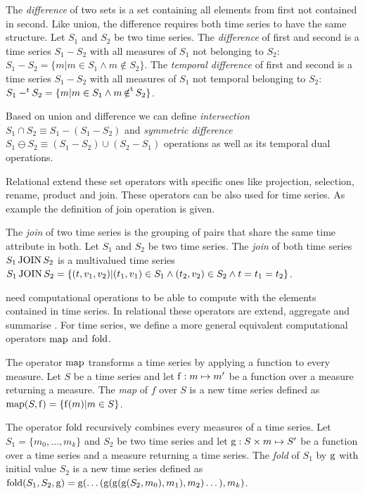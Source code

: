 The \emph{difference} of two sets is a set containing all elements
from first not contained in second. Like union, the difference
requires both time series to have the same structure. %
Let $S_1$ and $S_2$ be two time series. The \emph{difference} of first
and second is a time series $S_1 - S_2$ with all measures of $S_1$ not
belonging to $S_2$: $S_1 - S_2 = \{ m | m\in S_1 \wedge m \notin S_2 \}$. The \emph{temporal difference} of first and second is a time
series $S_1 - S_2$ with all measures of $S_1$ not temporal belonging
to $S_2$: $S_1 -^t S_2 = \{ m | m \in S_1 \wedge m \operatorname*{\notin^t} S_2 \}$.


Based on union and difference we can define \emph{intersection} $S_1\cap
S_2 \equiv S_1 - (S_1 - S_2)$ and \emph{symmetric difference} $S_1 \ominus
S_2 \equiv (S_1 - S_2) \cup (S_2 - S_1)$ operations as well as its
temporal dual operations.


Relational  extend these set operators with specific ones like
projection, selection, rename, product and join. These operators can
be also used for time series. As example the definition of join
operation is given.


The \emph{join} of two time series is the grouping of pairs that share
the same time attribute in both.  Let $S_1$ and $S_2$ be two time series.
The \emph{join} of both time series $S_1 \operatorname*{JOIN} S_2$ is a multivalued
time series $S_1 \operatorname*{JOIN} S_2 = \{ (t,v_1,v_2) | (t_1,v_1) \in S_1 \wedge
(t_2,v_2) \in S_2 \wedge t=t_1=t_2 \}$.


 need computational operations to be able to compute with
the elements contained in time series. In relational  these
operators are extend, aggregate and summarise
\cite{date:introduction}. For time series, we define a more general
equivalent computational operators $\operatorname*{map}$ and $\operatorname*{fold}$.


The operator $\operatorname*{map}$ transforms a time series by applying a function to
every measure.  Let $S$ be a time series and let $\operatorname*{f} :m \mapsto m'$ be a
function over a measure returning a measure. The \emph{map} of $f$
over $S$ is a new time series defined as $\operatorname*{map}(S,\operatorname*{f}) = \{ \operatorname*{f}(m) | m \in
S\}$.

The operator $\operatorname*{fold}$ recursively combines every measures of a time
series.  Let $S_1=\{m_0, \dotsc, m_k\}$ and $S_2$ be two time series
and let $\operatorname*{g}: S \times m \mapsto S'$ be a function over a time
series and a measure returning a time series. The \emph{fold} of $S_1$
by $\operatorname*{g}$ with initial value $S_2$ is a new time series defined as
$\operatorname*{fold}(S_1,S_2,\operatorname*{g}) = \operatorname*{g}(\dots(
\operatorname*{g}(\operatorname*{g}(\operatorname*{g}(S_2,m_0),\allowbreak m_1),\allowbreak m_2
)\dots),\allowbreak m_k)$. 

